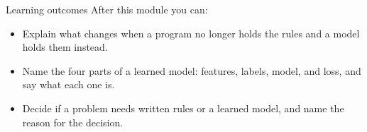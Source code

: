 \begin{frame}{Learning outcomes}
  After this module you can:
  \begin{itemize}
    \item Explain what changes when a program no longer holds the rules and
          a model holds them instead.
    \item Name the four parts of a learned model: features, labels, model,
          and loss, and say what each one is.
    \item Decide if a problem needs written rules or a learned model, and
          name the reason for the decision.
  \end{itemize}
\end{frame}